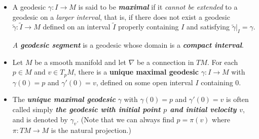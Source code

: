 \documentclass[11pt]{article}
\begin{document}
\begin{itemize}
\item \begin{definition}
A geodesic $\gamma: I \rightarrow M$  is said to be \emph{\textbf{maximal}} if it \emph{cannot be extended} to a geodesic on a \emph{larger interval}, that is, if there does not exist a geodesic $\widetilde{\gamma}: \widetilde{I} \rightarrow M$ defined on an interval $\widetilde{I}$ properly containing $I$ and satisfying $\widetilde{\gamma}|_{I} = \gamma$. 

\emph{A \textbf{geodesic segment}} is a geodesic whose domain is a \emph{\textbf{compact interval}}.
\end{definition}

\item \begin{corollary}
Let $M$ be a smooth manifold and let $\nabla$ be a connection in $TM$. For each $p \in M$ and $v \in T_{p}M$, there is a \textbf{unique maximal geodesic} $\gamma: I \rightarrow M$ with $\gamma(0) = p$ and $\gamma'(0) = v$, defined on some open interval $I$ containing $0$.
\end{corollary}

\item \begin{definition}
The \emph{\textbf{unique maximal geodesic}} $\gamma$ with $\gamma(0) = p$ and $\gamma'(0) = v$ is often called simply \emph{\textbf{the geodesic with initial point $p$ and initial velocity $v$}}, and is denoted by $\gamma_v$. (Note that we can always find $p = \pi(v)$ where $\pi: TM \rightarrow M$ is the natural projection.)
\end{definition}
\end{itemize}
\end{document}
